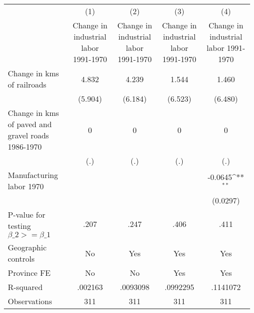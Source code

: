 {
\def\sym#1{\ifmmode^{#1}\else\(^{#1}\)\fi}
\begin{tabular}{l*{4}{c}}
\hline\hline
                &\multicolumn{1}{c}{(1)}&\multicolumn{1}{c}{(2)}&\multicolumn{1}{c}{(3)}&\multicolumn{1}{c}{(4)}\\
                &\multicolumn{1}{c}{Change in industrial labor 1991-1970}&\multicolumn{1}{c}{Change in industrial labor 1991-1970}&\multicolumn{1}{c}{Change in industrial labor 1991-1970}&\multicolumn{1}{c}{Change in industrial labor 1991-1970}\\
\hline
Change in kms of railroads&    4.832         &    4.239         &    1.544         &    1.460         \\
                &  (5.904)         &  (6.184)         &  (6.523)         &  (6.480)         \\
[1em]
Change in kms of paved and gravel roads 1986-1970&        0         &        0         &        0         &        0         \\
                &      (.)         &      (.)         &      (.)         &      (.)         \\
[1em]
Manufacturing labor 1970&                  &                  &                  &  -0.0645\sym{**} \\
                &                  &                  &                  & (0.0297)         \\
\hline
P-value for testing $\beta\_{2} >= \beta\_{1}$&     .207         &     .247         &     .406         &     .411         \\
Geographic controls&       No         &      Yes         &      Yes         &      Yes         \\
Province FE     &       No         &       No         &      Yes         &      Yes         \\
R-squared       &  .002163         & .0093098         & .0992295         & .1141072         \\
Observations    &      311         &      311         &      311         &      311         \\
\hline\hline
\end{tabular}
}
